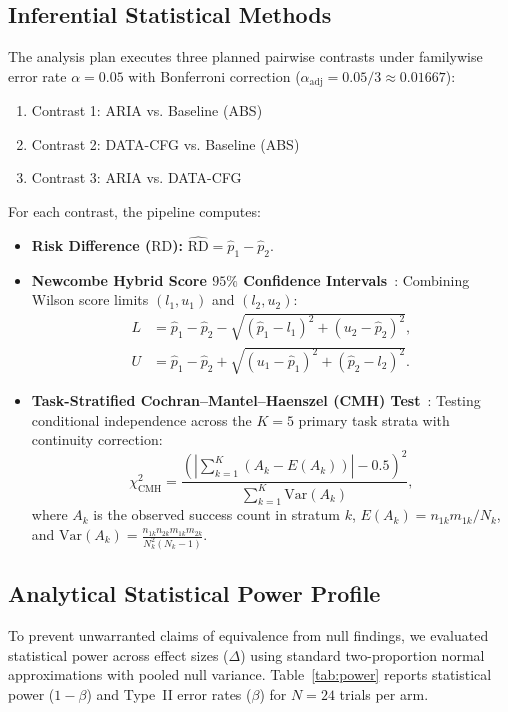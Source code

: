 \documentclass[11pt,a4paper]{article}
\begin{document}
\subsection{Inferential Statistical Methods}
The analysis plan executes three planned pairwise contrasts under familywise error rate $\alpha = 0.05$ with Bonferroni correction ($\alpha_{\text{adj}} = 0.05/3 \approx 0.01667$):
\begin{enumerate}
    \item Contrast 1: \textsc{ARIA} vs. Baseline (\textsc{ABS})
    \item Contrast 2: \textsc{DATA-CFG} vs. Baseline (\textsc{ABS})
    \item Contrast 3: \textsc{ARIA} vs. \textsc{DATA-CFG}
\end{enumerate}

For each contrast, the pipeline computes:
\begin{itemize}
    \item \textbf{Risk Difference ($\text{RD}$):} $\widehat{\text{RD}} = \hat{p}_1 - \hat{p}_2$.
    \item \textbf{Newcombe Hybrid Score $95\%$ Confidence Intervals}~\cite{newcombe1998interval}: Combining Wilson score limits $(l_1, u_1)$ and $(l_2, u_2)$:
    \begin{align}
    L &= \hat{p}_1 - \hat{p}_2 - \sqrt{(\hat{p}_1 - l_1)^2 + (u_2 - \hat{p}_2)^2}, \\
    U &= \hat{p}_1 - \hat{p}_2 + \sqrt{(u_1 - \hat{p}_1)^2 + (\hat{p}_2 - l_2)^2}.
    \end{align}
    \item \textbf{Task-Stratified Cochran--Mantel--Haenszel (CMH) Test}~\cite{agresti2002categorical}: Testing conditional independence across the $K=5$ primary task strata with continuity correction:
    \begin{equation}
    \chi^2_{\text{CMH}} = \frac{\left( \left| \sum_{k=1}^K (A_k - E(A_k)) \right| - 0.5 \right)^2}{\sum_{k=1}^K \text{Var}(A_k)},
    \end{equation}
    where $A_k$ is the observed success count in stratum $k$, $E(A_k) = n_{1k} m_{1k} / N_k$, and $\text{Var}(A_k) = \frac{n_{1k} n_{2k} m_{1k} m_{2k}}{N_k^2 (N_k - 1)}$.
\end{itemize}

\subsection{Analytical Statistical Power Profile}
To prevent unwarranted claims of equivalence from null findings, we evaluated statistical power across effect sizes ($\Delta$) using standard two-proportion normal approximations with pooled null variance. Table~\ref{tab:power} reports statistical power ($1 - \beta$) and Type~II error rates ($\beta$) for $N=24$ trials per arm.
\end{document}
